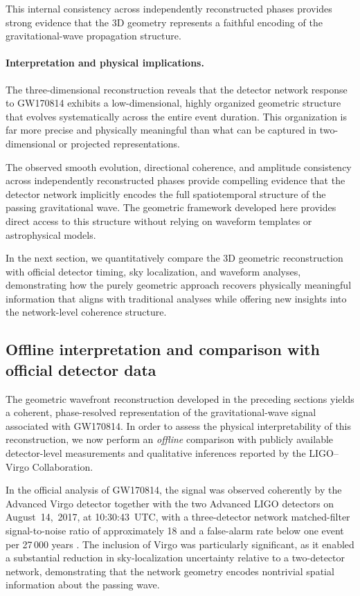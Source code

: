 \documentclass[11pt,a4paper]{article}
\begin{document}
This internal consistency across independently reconstructed phases provides strong
evidence that the 3D geometry represents a faithful encoding of the gravitational-wave
propagation structure.

\paragraph{Interpretation and physical implications.}
The three-dimensional reconstruction reveals that the detector network response to
GW170814 exhibits a low-dimensional, highly organized geometric structure that evolves
systematically across the entire event duration.
This organization is far more precise and physically meaningful than what can be captured
in two-dimensional or projected representations.

The observed smooth evolution, directional coherence, and amplitude consistency across
independently reconstructed phases provide compelling evidence that the detector network
implicitly encodes the full spatiotemporal structure of the passing gravitational wave.
The geometric framework developed here provides direct access to this structure without
relying on waveform templates or astrophysical models.

In the next section, we quantitatively compare the 3D geometric reconstruction with
official detector timing, sky localization, and waveform analyses, demonstrating how
the purely geometric approach recovers physically meaningful information that aligns with
traditional analyses while offering new insights into the network-level coherence
structure.







\subsection{Offline interpretation and comparison with official detector data}
\label{sec:offline_comparison}

The geometric wavefront reconstruction developed in the preceding sections yields
a coherent, phase-resolved representation of the gravitational-wave signal
associated with GW170814.
In order to assess the physical interpretability of this reconstruction, we now
perform an \emph{offline} comparison with publicly available detector-level
measurements and qualitative inferences reported by the LIGO--Virgo
Collaboration.

In the official analysis of GW170814, the signal was observed coherently by the
Advanced Virgo detector together with the two Advanced LIGO detectors on
August~14,~2017, at 10:30:43~UTC, with a three-detector network matched-filter
signal-to-noise ratio of approximately 18 and a false-alarm rate below one event
per 27\,000 years \cite{Abbott2019}. %
The inclusion of Virgo was particularly significant, as it enabled a substantial
reduction in sky-localization uncertainty relative to a two-detector network,
demonstrating that the network geometry encodes nontrivial spatial information
about the passing wave.
\end{document}
